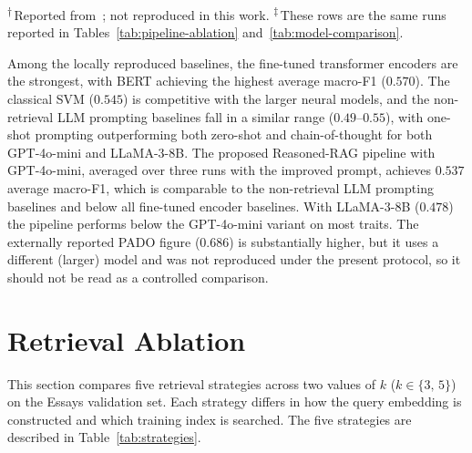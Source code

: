 \documentclass[../main.tex]{subfiles}
\begin{document}
\noindent\textsuperscript{$\dagger$}\,Reported from~\cite{yeo2025pado}; not reproduced
in this work.
\noindent\textsuperscript{$\ddagger$}\,These rows are the same runs reported in
Tables~\ref{tab:pipeline-ablation} and~\ref{tab:model-comparison}.

Among the locally reproduced baselines, the fine-tuned transformer encoders are
the strongest, with BERT achieving the highest average macro-F1 ($0.570$). The
classical SVM ($0.545$) is competitive with the larger neural models, and the
non-retrieval LLM prompting baselines fall in a similar range ($0.49$--$0.55$),
with one-shot prompting outperforming both zero-shot and chain-of-thought for
both GPT-4o-mini and LLaMA-3-8B. The proposed Reasoned-RAG pipeline with
GPT-4o-mini, averaged over three runs with the improved prompt, achieves $0.537$
average macro-F1, which is comparable to the non-retrieval LLM prompting baselines
and below all fine-tuned encoder baselines. With LLaMA-3-8B ($0.478$) the pipeline
performs below the GPT-4o-mini variant on most traits. The externally reported
PADO figure ($0.686$) is substantially higher, but it uses a different (larger)
model and was not reproduced under the present protocol, so it should not be read
as a controlled comparison.

\section{Retrieval Ablation}
\label{sec:retrieval-ablation}


This section compares five retrieval strategies across two values of $k$
($k \in \{3,\,5\}$) on the Essays validation set.
Each strategy differs in how the query embedding is constructed and which
training index is searched.
The five strategies are described in Table~\ref{tab:strategies}.
\end{document}

